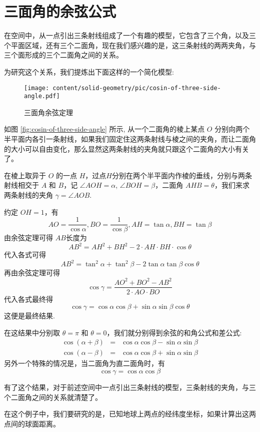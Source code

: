 
\section{三面角的余弦公式}
\label{sec:trihedral-angle}

在空间中，从一点引出三条射线组成了一个有趣的模型，它包含了三个角，以及三个平面区域，还有三个二面角，现在我们感兴趣的是，这三条射线的两两夹角，与三个面形成的三个二面角之间的关系。

为研究这个关系，我们提炼出下面这样的一个简化模型:


\begin{figure}[htbp]
\centering
\texttt{[image: content/solid-geometry/pic/cosin-of-three-side-angle.pdf]}
\caption{三面角余弦定理}
\label{fig:cosin-of-three-side-angle}
\end{figure}

如图 \autoref{fig:cosin-of-three-side-angle} 所示, 从一个二面角的棱上某点 $O$ 分别向两个半平面内各引一条射线，如果我们固定住这两条射线与棱之间的夹角，而让二面角的大小可以自由变化，那么显然这两条射线的夹角就只跟这个二面角的大小有关了。

在棱上取异于 $O$ 的一点 $H$，过点$H$分别在两个半平面内作棱的垂线，分别与两条射线相交于 $A$ 和 $B$，记 $\angle AOH = \alpha$, $\angle BOH=\beta$，二面角 $AHB=\theta$，我们来求 两条射线的夹角 $\gamma = \angle AOB$.

约定 $OH = 1$，有
\[ AO = \frac{1}{\cos{\alpha}}, BO = \frac{1}{\cos{\beta}}, AH = \tan{\alpha}, BH = \tan{\beta} \]
由余弦定理可得 $AB$长度为
\[ AB^{2} = AH^2+BH^2-2 \cdot AH \cdot BH \cdot \cos{\theta} \]
代入各式可得
\[ AB^2 = \tan^2{\alpha} + \tan^2{\beta} - 2 \tan{\alpha} \tan{\beta} \cos{\theta} \]
再由余弦定理可得
\[ \cos{\gamma} = \frac{AO^2+BO^2-AB^2}{2 \cdot AO \cdot BO} \]
代入各式最终得
\[ \cos{\gamma} = \cos{\alpha}\cos{\beta}+\sin{\alpha}\sin{\beta}\cos{\theta} \]
这便是最终结果.

在这结果中分别取 $\theta = \pi$ 和 $\theta = 0$，我们就分别得到余弦的和角公式和差公式:
\begin{eqnarray*}
  \cos{(\alpha+\beta)} & = & \cos{\alpha}\cos{\beta} - \sin{\alpha}\sin{\beta} \\
  \cos{(\alpha-\beta)} & = & \cos{\alpha}\cos{\beta} + \sin{\alpha}\sin{\beta} 
\end{eqnarray*}
另外一个特殊的情况是，当二面角为直二面角时，有
\[ \cos{\gamma} = \cos{\alpha}\cos{\beta} \]

有了这个结果，对于前述空间中一点引出三条射线的模型，三条射线的夹角，与三个二面角之间的关系就清楚了。

\begin{example}[根据经纬度计算地球上两点间的(球面)距离]
  在这个例子中，我们要研究的是，已知地球上两点的经纬度坐标，如果计算出这两点间的球面距离。
\end{example}


